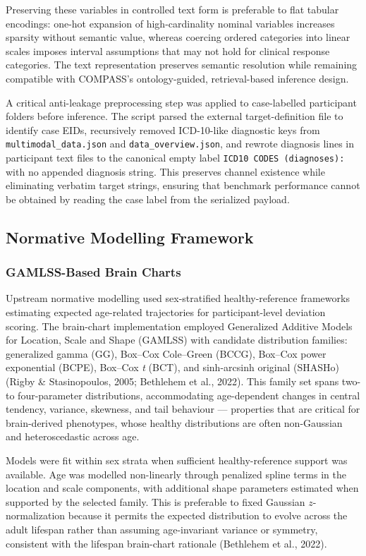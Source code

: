 \documentclass[11pt,a4paper,twoside]{article}
\begin{document}
Preserving these variables in controlled text form is preferable to flat tabular encodings: one-hot expansion of high-cardinality nominal variables increases sparsity without semantic value, whereas coercing ordered categories into linear scales imposes interval assumptions that may not hold for clinical response categories. The text representation preserves semantic resolution while remaining compatible with COMPASS's ontology-guided, retrieval-based inference design.

A critical anti-leakage preprocessing step was applied to case-labelled participant folders before inference. The script parsed the external target-definition file to identify case EIDs, recursively removed ICD-10-like diagnostic keys from \texttt{multimodal\_{\allowbreak}data.{\allowbreak}json} and \texttt{data\_{\allowbreak}overview.{\allowbreak}json}, and rewrote diagnosis lines in participant text files to the canonical empty label \texttt{ICD10 CODES (diagnoses):} with no appended diagnosis string. This preserves channel existence while eliminating verbatim target strings, ensuring that benchmark performance cannot be obtained by reading the case label from the serialized payload.

\subsection{Normative Modelling Framework}
\subsubsection{GAMLSS-Based Brain Charts}
Upstream normative modelling used sex-stratified healthy-reference frameworks estimating expected age-related trajectories for participant-level deviation scoring. The brain-chart implementation employed Generalized Additive Models for Location, Scale and Shape (GAMLSS) with candidate distribution families: generalized gamma (GG), Box--Cox Cole--Green (BCCG), Box--Cox power exponential (BCPE), Box--Cox \textit{t} (BCT), and sinh-arcsinh original (SHASHo) (Rigby \& Stasinopoulos, 2005; Bethlehem et al., 2022). This family set spans two- to four-parameter distributions, accommodating age-dependent changes in central tendency, variance, skewness, and tail behaviour --- properties that are critical for brain-derived phenotypes, whose healthy distributions are often non-Gaussian and heteroscedastic across age.

Models were fit within sex strata when sufficient healthy-reference support was available. Age was modelled non-linearly through penalized spline terms in the location and scale components, with additional shape parameters estimated when supported by the selected family. This is preferable to fixed Gaussian $z$-normalization because it permits the expected distribution to evolve across the adult lifespan rather than assuming age-invariant variance or symmetry, consistent with the lifespan brain-chart rationale (Bethlehem et al., 2022).
\end{document}
